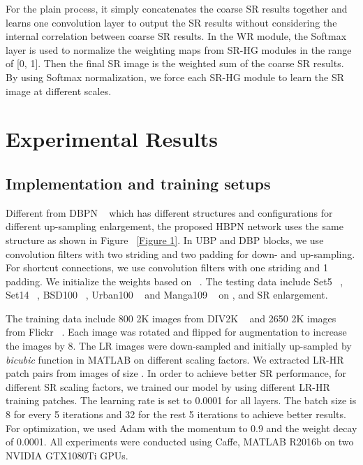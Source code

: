 \documentclass[10pt,twocolumn,letterpaper]{article}
\begin{document}
For the plain process, it simply concatenates the coarse SR results together and learns one convolution layer to output the SR results without considering the internal correlation between coarse SR results. In the WR module, the Softmax layer is used to normalize the weighting maps from SR-HG modules in the range of [0, 1]. Then the final SR image is the weighted sum of the coarse SR results. By using Softmax normalization, we force each SR-HG module to learn the SR image at different scales. 

\section{Experimental Results}

\subsection{Implementation and training setups}

Different from DBPN ~\cite{DBPN} which has different structures and configurations for different up-sampling enlargement, the proposed HBPN network uses the same structure as shown in Figure ~\ref{Figure 1}. In UBP and DBP blocks, we use  convolution filters with two striding and two padding for down- and up-sampling. For shortcut connections, we use  convolution filters with one striding and 1 padding. We initialize the weights based on ~\cite{PReLU}. The testing data include Set5 ~\cite{Set5}, Set14 ~\cite{Set14}, BSD100 ~\cite{BSD100}, Urban100 ~\cite{Urban100} and Manga109 ~\cite{Manga109} on ,  and  SR enlargement.

The training data include 800 2K images from DIV2K ~\cite{NTIRE} and 2650 2K images from Flickr ~\cite{EDSR}. Each image was rotated and flipped for augmentation to increase the images by 8. The LR images were down-sampled and initially up-sampled by \textit{bicubic} function in MATLAB on different scaling factors. We extracted LR-HR patch pairs from images of size . In order to achieve better SR performance, for different SR scaling factors, we trained our model by using different LR-HR training patches. The learning rate is set to 0.0001 for all layers. The batch size is 8 for every 5 iterations and 32 for the rest 5 iterations to achieve better results. For optimization, we used Adam with the momentum to 0.9 and the weight decay of 0.0001. All experiments were conducted using Caffe, MATLAB R2016b on two NVIDIA GTX1080Ti GPUs.
\end{document}
